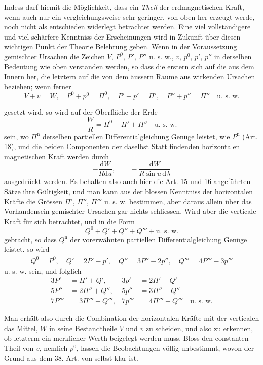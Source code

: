 Indess darf hiemit die Möglichkeit, dass ein \textit{Theil} der erdmagnetischen Kraft, wenn auch nur ein vergleichungsweise sehr geringer, von oben her erzeugt werde, noch nicht als entschieden widerlegt betrachtet werden. Eine viel vollständigere und viel schärfere Kenntniss der Erscheinungen wird in Zukunft über diesen wichtigen Punkt der Theorie Belehrung geben. Wenn in der Voraussetzung gemischter Ursachen die Zeichen $V$, $P^0$, $P'$, $P''$ u. s. w., $v$, $p^0$, $p'$, $p''$ in derselben Bedeutung wie oben verstanden werden, so dass die erstern sich auf die aus dem Innern her, die letztern auf die von dem äussern Raume aus wirkenden Ursachen beziehen; wenn ferner
\[
V+v=W,\quad P^0+p^0=\Pi^0,\quad P'+p'=\Pi',\quad P''+p''=\Pi''\quad\text{u. s. w.}
\]
\par\clearpage
{}
\noindent gesetzt wird, so wird auf der Oberfläche der Erde
\[
\frac WR=\Pi^0+\Pi'+\Pi''\quad\text{u. s. w.}
\]
sein, wo $\Pi^{\mathrm n}$ derselben partiellen Differentialgleichung Genüge leistet, wie $P^{\mathrm n}$ (Art. 18), und die beiden Componenten der daselbst Statt findenden horizontalen magnetischen Kraft werden durch
\[
-\frac{\mathrm dW}{R\mathrm du},\qquad-\frac{\mathrm dW}{R\sin u\,\mathrm d\lambda}
\]
ausgedrückt werden. Es behalten also auch hier die Art. 15 und 16 angeführten Sätze ihre Gültigkeit, und man kann aus der blossen Kenntniss der horizontalen Kräfte die Grössen $\Pi'$, $\Pi''$, $\Pi'''$ u. s. w. bestimmen, aber daraus allein über das Vorhandensein gemischter Ursachen gar nichts schliessen. Wird aber die verticale Kraft für sich betrachtet, und in die Form
\[
Q^0+Q'+Q''+Q'''+\text{u. s. w.}
\]
gebracht, so dass $Q^{\mathrm n}$ der vorerwähnten partiellen Differentialgleichung Genüge leistet. so wird
\[
\begin{gathered}
Q^0=P^0,\quad Q'=2P'-p',\quad Q''=3P''-2p'',\quad Q'''=4P'''-3p'''
\end{gathered}
\]
u. s. w. sein, und folglich
\[
\begin{aligned}
3P'&=\Pi'+Q',&3p'&=2\Pi'-Q'\\
5P''&=2\Pi''+Q'',&5p''&=3\Pi''-Q''\\
7P'''&=3\Pi'''+Q''',&7p'''&=4\Pi'''-Q'''\quad\text{u. s. w.}
\end{aligned}
\]

Man erhält also durch die Combination der horizontalen Kräfte mit der verticalen das Mittel, $W$ in seine Bestandtheile $V$ und $v$ zu scheiden, und also zu erkennen, ob letzterm ein merklicher Werth beigelegt werden muss. Bloss den constanten Theil von $v$, nemlich $p^0$, lassen die Beobachtungen völlig unbestimmt, wovon der Grund aus dem 38. Art. von selbst klar ist.

